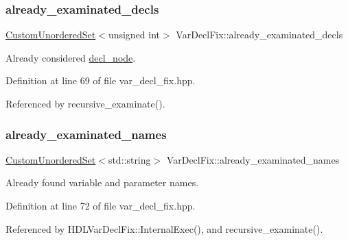 \subsubsection{\texorpdfstring{already\+\_\+examinated\+\_\+decls}{already\_examinated\_decls}}
{\footnotesize\ttfamily \hyperlink{classCustomUnorderedSet}{Custom\+Unordered\+Set}$<$unsigned int$>$ Var\+Decl\+Fix\+::already\+\_\+examinated\+\_\+decls\hspace{0.3cm}{\ttfamily [protected]}}



Already considered \hyperlink{structdecl__node}{decl\+\_\+node}. 



Definition at line 69 of file var\+\_\+decl\+\_\+fix.\+hpp.



Referenced by recursive\+\_\+examinate().

\mbox{\label{classVarDeclFix_aa2aa0bb5e898f1c86710d3b6e65c430d}} 
\subsubsection{\texorpdfstring{already\+\_\+examinated\+\_\+names}{already\_examinated\_names}}
{\footnotesize\ttfamily \hyperlink{classCustomUnorderedSet}{Custom\+Unordered\+Set}$<$std\+::string$>$ Var\+Decl\+Fix\+::already\+\_\+examinated\+\_\+names\hspace{0.3cm}{\ttfamily [protected]}}



Already found variable and parameter names. 



Definition at line 72 of file var\+\_\+decl\+\_\+fix.\+hpp.



Referenced by H\+D\+L\+Var\+Decl\+Fix\+::\+Internal\+Exec(), and recursive\+\_\+examinate().

\mbox{\label{classVarDeclFix_a2b661a70923003acd493dc63b428898f}} 
